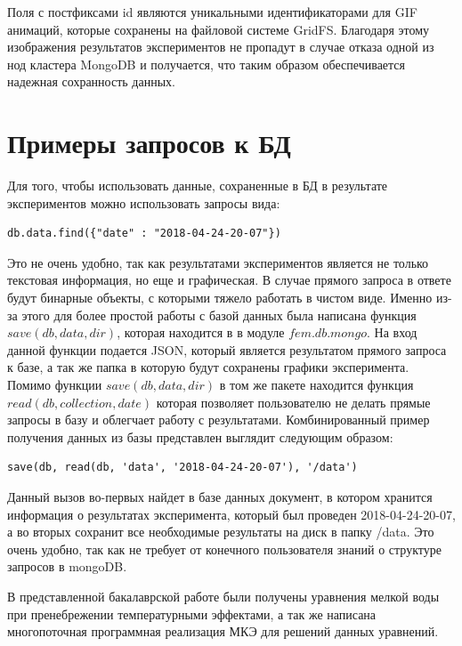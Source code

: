 \documentclass[14pt]{extreport}
\begin{document}
Поля с постфиксами id являются уникальными идентификаторами для GIF анимаций, которые сохранены на файловой системе GridFS. Благодаря этому изображения  результатов экспериментов не пропадут в случае отказа одной из нод кластера MongoDB и получается, что таким образом обеспечивается надежная сохранность данных.

\section{Примеры запросов к БД}
Для того, чтобы использовать данные, сохраненные в БД в результате экспериментов можно использовать запросы вида:

\begin{lstlisting}
db.data.find({"date" : "2018-04-24-20-07"})
\end{lstlisting}

Это не очень удобно, так как результатами экспериментов является не только текстовая информация, но еще и графическая. В случае прямого запроса в ответе будут бинарные объекты, с которыми тяжело работать в чистом виде. Именно из-за этого для более простой работы с базой данных была написана функция $save(db, data, dir)$, которая находится в в модуле $fem.db.mongo$. На вход данной функции подается JSON, который является результатом прямого запроса к базе, а так же папка в которую будут сохранены графики эксперимента. Помимо функции $save(db, data, dir)$ в том же пакете находится функция $read(db, collection, date)$ которая позволяет пользователю не делать прямые запросы в базу и облегчает работу с результатами. Комбинированный пример получения данных из базы представлен выглядит следующим образом:

\begin{lstlisting}
save(db, read(db, 'data', '2018-04-24-20-07'), '/data')
\end{lstlisting}

Данный вызов во-первых найдет в базе данных документ, в котором хранится информация о результатах эксперимента, который был проведен 2018-04-24-20-07, а во вторых сохранит все необходимые результаты на диск в папку /data. Это очень удобно, так как не требует от конечного пользователя знаний о структуре запросов в mongoDB. 


\conclusions

В представленной бакалаврской работе были получены уравнения мелкой воды при пренебрежении температурными эффектами, а так же написана многопоточная программная реализация МКЭ для решений данных уравнений.
\end{document}
